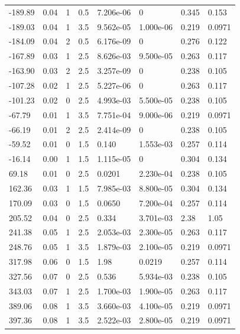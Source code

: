\documentclass[preview]{standalone}
\begin{document}
{{\begin{tabular}{L{1.2cm}C{1.2cm} C{0.3cm}C{0.5cm} C{1.4cm}C{1.4cm} C{1.4cm}C{1.4cm}}
  -189.89  &  0.04  & 1     & 0.5 &  7.206e-06  & 0  & 0.345 &  0.153   \\ 
  -189.03  &  0.04  & 1     & 3.5 &  9.562e-05  & 1.000e-06  & 0.219 &  0.0971   \\ 
  -184.09  &  0.04  & 2     & 0.5 &  6.176e-09  & 0  & 0.276 &  0.122   \\ 
  -167.89  &  0.03  & 1     & 2.5 &  8.626e-03  & 9.500e-05  & 0.263 &  0.117   \\ 
  -163.90  &  0.03  & 2     & 2.5 &  3.257e-09  & 0  & 0.238 &  0.105   \\ 
  -107.28  &  0.02  & 1     & 2.5 &  5.227e-06  & 0  & 0.263 &  0.117   \\ 
  -101.23  &  0.02  & 0     & 2.5 &  4.993e-03  & 5.500e-05  & 0.238 &  0.105   \\ 
  -67.79  &  0.01  & 1     & 3.5 &  7.751e-04  & 9.000e-06  & 0.219 &  0.0971   \\ 
  -66.19  &  0.01  & 2     & 2.5 &  2.414e-09  & 0  & 0.238 &  0.105   \\ 
  -59.52  &  0.01  & 0     & 1.5 &  0.140  & 1.553e-03  & 0.257 &  0.114   \\ 
  -16.14  &  0.00  & 1     & 1.5 &  1.115e-05  & 0  & 0.304 &  0.134   \\ 
  69.18  &  0.01  & 0     & 2.5 &  0.0201  & 2.230e-04  & 0.238 &  0.105   \\ 
  162.36  &  0.03  & 1     & 1.5 &  7.985e-03  & 8.800e-05  & 0.304 &  0.134   \\ 
  170.09  &  0.03  & 0     & 1.5 &  0.0650  & 7.200e-04  & 0.257 &  0.114   \\ 
  205.52  &  0.04  & 0     & 2.5 &  0.334  & 3.701e-03  & 2.38 &  1.05   \\ 
  241.38  &  0.05  & 1     & 2.5 &  2.053e-03  & 2.300e-05  & 0.263 &  0.117   \\ 
  248.76  &  0.05  & 1     & 3.5 &  1.879e-03  & 2.100e-05  & 0.219 &  0.0971   \\ 
  317.98  &  0.06  & 0     & 1.5 &  1.98  & 0.0219  & 0.257 &  0.114   \\ 
  327.56  &  0.07  & 0     & 2.5 &  0.536  & 5.934e-03  & 0.238 &  0.105   \\ 
  343.03  &  0.07  & 1     & 2.5 &  1.700e-03  & 1.900e-05  & 0.263 &  0.117   \\ 
  389.06  &  0.08  & 1     & 3.5 &  3.660e-03  & 4.100e-05  & 0.219 &  0.0971   \\ 
  397.36  &  0.08  & 1     & 3.5 &  2.522e-03  & 2.800e-05  & 0.219 &  0.0971   \\ 

\end{tabular}}}
\end{document}
